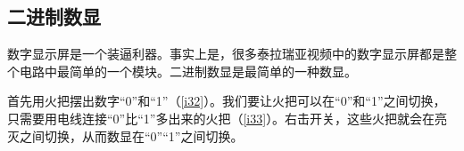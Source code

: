 \begin{figure}[!h]
\begin{center}
\end{center}
\caption{}
\label{i7:10}
\end{figure}

\subsection{二进制数显}

数字显示屏是一个装逼利器。事实上是，很多泰拉瑞亚视频中的数字显示屏都是整个电路中最简单的一个模块。二进制数显是最简单的一种数显。

首先用火把摆出数字“0”和“1”（\autoref{i32}）。我们要让火把可以在“0”和“1”之间切换，只需要用电线连接“0”比“1”多出来的火把（\autoref{i33}）。右击开关，这些火把就会在亮灭之间切换，从而数显在“0”“1”之间切换。

